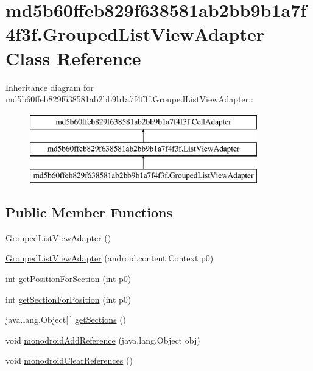 \hypertarget{classmd5b60ffeb829f638581ab2bb9b1a7f4f3f_1_1_grouped_list_view_adapter}{
\section{md5b60ffeb829f638581ab2bb9b1a7f4f3f.GroupedListViewAdapter Class Reference}
\label{classmd5b60ffeb829f638581ab2bb9b1a7f4f3f_1_1_grouped_list_view_adapter}
}
Inheritance diagram for md5b60ffeb829f638581ab2bb9b1a7f4f3f.GroupedListViewAdapter::\begin{figure}[H]
\begin{center}
\leavevmode
\includegraphics[height=3cm]{classmd5b60ffeb829f638581ab2bb9b1a7f4f3f_1_1_grouped_list_view_adapter}
\end{center}
\end{figure}
\subsection*{Public Member Functions}
\begin{CompactItemize}
\item 
\hyperlink{classmd5b60ffeb829f638581ab2bb9b1a7f4f3f_1_1_grouped_list_view_adapter_31105027750eaab2325800de81a73623}{GroupedListViewAdapter} ()
\item 
\hyperlink{classmd5b60ffeb829f638581ab2bb9b1a7f4f3f_1_1_grouped_list_view_adapter_b328fe93ec4962ae6c34cea2a24a4897}{GroupedListViewAdapter} (android.content.Context p0)
\item 
int \hyperlink{classmd5b60ffeb829f638581ab2bb9b1a7f4f3f_1_1_grouped_list_view_adapter_f2a7abf78786d757e59276b12b020f80}{getPositionForSection} (int p0)
\item 
int \hyperlink{classmd5b60ffeb829f638581ab2bb9b1a7f4f3f_1_1_grouped_list_view_adapter_568104d4fe51eda51f33509906fb056d}{getSectionForPosition} (int p0)
\item 
java.lang.Object\mbox{[}$\,$\mbox{]} \hyperlink{classmd5b60ffeb829f638581ab2bb9b1a7f4f3f_1_1_grouped_list_view_adapter_5303b39042c865b22540785f37da5a3e}{getSections} ()
\item 
void \hyperlink{classmd5b60ffeb829f638581ab2bb9b1a7f4f3f_1_1_grouped_list_view_adapter_dbd6d6284566d262ab2a3d9a44e0f906}{monodroidAddReference} (java.lang.Object obj)
\item 
void \hyperlink{classmd5b60ffeb829f638581ab2bb9b1a7f4f3f_1_1_grouped_list_view_adapter_4634afbff45178960582fdfba5d55008}{monodroidClearReferences} ()
\end{CompactItemize}
